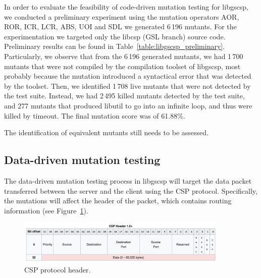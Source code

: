 

In order to evaluate the feasibility of code-driven mutation testing for libgscsp, we conducted a preliminary experiment using the mutation operators AOR, ROR, ICR, LCR, ABS, UOI and SDL we generated 6\,196 mutants. For the experimentation we targeted only the libcsp (GSL branch) source code. Preliminary results can be found in Table~\ref{table:libgscsp_preliminary}.
Particularly, we observe that from the 6\,196 generated mutants, we had 1\,700 mutants that were not compiled by the compilation toolset of libgscsp, most probably because the mutation introduced a syntactical error that was detected by the toolset.
Then, we identified 1\,708 live mutants that were not detected by the test suite. Instead, we had 2\,495 killed mutants detected by the test suite, and 277 mutants that produced libutil to go into an infinite loop, and thus were killed by timeout. The final mutation score was of 61.88\%.

The identification of equivalent mutants still needs to be assessed.


\subsection{Data-driven mutation testing}


The data-driven mutation testing process in libgscsp will target the data packet transferred between the server and the client using the CSP protocol. Specifically, the mutations will affect the header of the packet, which contains routing information (see Figure~\ref{fig:csp_packet}). 



\begin{figure}[h]
  \centering
    \includegraphics[width=0.9\textwidth]{images/csp_packet}
      \caption{CSP protocol header.}
      \label{fig:csp_packet}
\end{figure}


